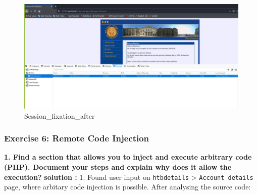 \begin{figure}
\centering
\includegraphics{images/task2/Session_fixation_after.JPG}
\caption{Session\_fixation\_after}
\end{figure}

\hypertarget{exercise-6-remote-code-injection}{%
\subsubsection{Exercise 6: Remote Code
Injection}\label{exercise-6-remote-code-injection}}

\textbf{1. Find a section that allows you to inject and execute
arbitrary code (PHP). Document your steps and explain why does it allow
the execution?} \textbf{solution :} 1. Found user input on
\texttt{htbdetails} \textgreater{} \texttt{Account\ details} page, where
arbitary code injection is possible. After analysing the source code:

\begin{Shaded}
\begin{Highlighting}[]
 \OperatorTok{=}   \NormalTok{(}\StringTok{\textquotesingle{}}\SpecialCharTok{\textbackslash{}\textbackslash{}}\StringTok{\textquotesingle{}}\OtherTok{,}
                \StringTok{\textquotesingle{}}\SpecialCharTok{\textbackslash{}\textbackslash{}\textbackslash{}\textbackslash{}}\StringTok{\textquotesingle{}}\OtherTok{,} \NormalTok{[}\NormalTok{]) }
\StringTok{\textgreater{}}\SpecialCharTok{\textbackslash{}\textbackslash{}\textbackslash{}\textbackslash{}}\SpecialCharTok{\textbackslash{}\textbackslash{}}\OtherTok{;}
\end{Highlighting}
\end{Shaded}

